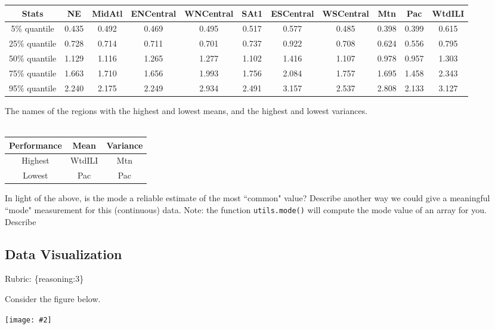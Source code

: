 \documentclass{article}
\def\rubric#1{\gre{Rubric: \{#1\}}}{}
\def\blu#1{{\color{blu}#1}}
\def\gre#1{{\color{gre}#1}}
\def\ans#1{{\color{ans}#1}}
\newcommand{\fig}[2]{\texttt{[image: \#2]}}
\begin{document}
{{    \setlength{\tabcolsep}{2pt}
    \begin{tabular}{SSSSSSSSSSS} \toprule
        {Stats} & {NE} & {MidAtl} & {ENCentral} & {WNCentral} & {SAt1} & {ESCentral} & {WSCentral} & {Mtn} & {Pac} & {WtdILI} \\ \midrule
        {5\% quantile} & 0.435 & 0.492 & 0.469 & 0.495 & 0.517 & 0.577 & 0.485 & 0.398 & 0.399 & 0.615 \\
        {25\% quantile} & 0.728 & 0.714 & 0.711 & 0.701 & 0.737 & 0.922 & 0.708 & 0.624 & 0.556 & 0.795 \\
        {50\% quantile} & 1.129 & 1.116 & 1.265 & 1.277 & 1.102 & 1.416 & 1.107 & 0.978 & 0.957 & 1.303 \\
        {75\% quantile} & 1.663 & 1.710 & 1.656 & 1.993 & 1.756 & 2.084 & 1.757 & 1.695 & 1.458 & 2.343 \\
        {95\% quantile} & 2.240 & 2.175 & 2.249 & 2.934 & 2.491 & 3.157 & 2.537 & 2.808 & 2.133 & 3.127 \\ \bottomrule
    \end{tabular}
    \normalsize
}
\setlength{\tabcolsep}{6pt}
\item The names of the regions with the highest and lowest means, and the highest and lowest variances. \\ \\
\ans{
    \scriptsize
    \setlength{\tabcolsep}{2pt}
    \begin{tabular}{SSS} \toprule
        {Performance} & {Mean} & {Variance} \\ \midrule
        {Highest} & {WtdILI} & {Mtn} \\
        {Lowest} & {Pac} & {Pac} \\ \bottomrule
    \end{tabular}
    \normalsize
}
\setlength{\tabcolsep}{6pt}
}
In light of the above, \blu{is the mode a reliable estimate of the most ``common" value? Describe another way we could give a meaningful ``mode" measurement for this (continuous) data.} Note: the function \texttt{utils.mode()} will compute the mode value of an array for you. \\
\ans{
    Describe
}


\subsection{Data Visualization}
\rubric{reasoning:3}

Consider the figure below.

\fig{1}{../figs/visualize-unlabeled}
\end{document}
